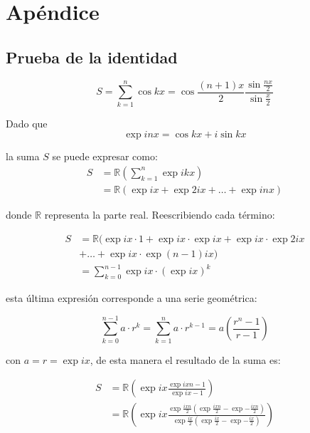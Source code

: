 \chapter{Apéndice}

\section{Prueba de la identidad}\label{A:proof}
$$ S = \sum_{k=1}^n\cos{kx}=\cos{\frac{(n+1)x}{2}} \frac{\sin{\frac{nx}{2}}}{\sin{\frac{x}{2}}} $$

Dado que
\begin{equation}
  \label{eq:a.1}
  \exp{inx} = \cos{kx} + i \sin{kx}
\end{equation}

la suma $S$ se puede expresar como:
\begin{align}
  \label{eq:a.2}
  S &= \mathbb{R} \left ( \sum_{k=1}^n \exp{ikx}   \right ) \\
  &= \mathbb{R} \left( \exp{ix} + \exp{2ix} + \dots + \exp{inx} \right)
\end{align}

donde $\mathbb{R}$ representa la parte real. Reescribiendo cada término:

\begin{align}
  \label{eq:a.3}
  S  &= \mathbb{R} ( \exp{ix}\cdot 1 + \exp{ix} \cdot \exp{ix} + \exp{ix} \cdot \exp{2ix} \nonumber \\
  & + \dots + \exp{ix} \cdot \exp{(n-1)ix}) \nonumber \\
&= \sum_{k=0}^{n-1}\exp{ix} \cdot \left( \exp{ix} \right)^k
\end{align}

esta última expresión corresponde a una serie geométrica:

\begin{equation}
  \label{eq:a.4}
  \sum_{k=0}^{n-1} a \cdot r^k = \sum_{k=1}^n a \cdot r^{k-1} = a\left( \frac{r^n -1}{r-1}\right)
\end{equation}

con $a = r = \exp{ix}$, de esta manera el resultado de la suma es:

\begin{align}
  \label{eq:a.5}
  S & = \mathbb{R}\left ( \exp{ix}\frac{\exp{ixn}-1}{\exp{ix}-1}\right) \nonumber \\
  & = \mathbb{R} \left( \exp{ix} \frac{\exp{\frac{ixn}{2}}( \exp{\frac{ixn}{2}} - \exp{-\frac{ixn}{2}} )}{\exp{\frac{ix}{2}}( \exp{\frac{ix}{2}} - \exp{-\frac{ix}{2}} )} \right)
\end{align}

